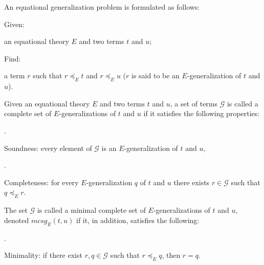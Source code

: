 \documentclass[10pt,a4paper]{amsart}
\begin{document}
 
 
An equational generalization problem is formulated as follows:\par
  Given:  
 
an equational theory $E$ and two terms $t$ and $u$;\par
 
  Find:  
 
a term $r$ such that $r\preceq_{E}t$ and $r\preceq_{E}u$ ($r$ is said to be an $E$-generalization of $t$ and $u$).\par
 
   
 
 
Given an equational theory $E$ and two terms $t$ and $u$, a set of terms $\mathcal{G}$ is called a complete set of $E$-generalizations of $t$ and $u$ if it satisfies the following properties:\par
  
\par{}. 
 
Soundness: every element of $\mathcal{G}$ is an $E$-generalization of $t$ and $u$,\par
 
 
 
\par{}. 
 
Completeness: for every $E$-generalization $q$ of $t$ and $u$ there exists $r\in\mathcal{G}$ such that $q\preceq_{E}r$.\par
 
 
  
The set $\mathcal{G}$ is called a minimal complete set of $E$-generalizations of $t$ and $u$, denoted $\mathit{mcsg}_{E}(t,u)$ if it, in addition, satisfies the following:\par
  
\par{}. 
 
Minimality: if there exist $r,q\in\mathcal{G}$ such that $r\preceq_{E}q$, then $r=q$.\par
 
 
  
 
\end{document}

